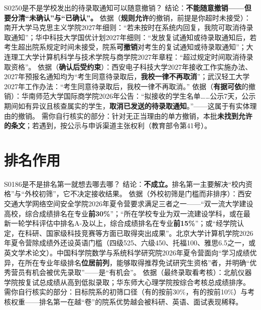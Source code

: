 \begin{qa}{S0250}{是不是学校发出的待录取通知可以随意撤销？}
结论：\textbf{不能随意撤销——但要分清“未确认”与“已确认”。}
依据（\textbf{规则允许}的撤销，前提是你超时未接受）：南开大学马克思主义学院2027年细则：“若未按时在系统内回复，我院可取消待录取通知”；华中科技大学国优计划2027年细则：“发放复试通知或待录取通知后，若考生超出院系规定时间未接受，院系\textbf{可撤销}对考生的复试通知或待录取通知”；大连理工大学计算机科学与技术学院与商学院2027年章程：“超过规定时间取消待录取资格”。
依据（\textbf{确认后受约束}）：西安电子科技大学2027年接收工作实施办法、2027年预报名通知均为“考生同意待录取后，\textbf{我校一律不再取消}”；武汉轻工大学2027年工作办法：“考生同意待录取后，我校一律不再取消。”
依据（\textbf{有据可依}的撤销）：华南师范大学国际商学院2026年公告：“拟接收的学生名单……公示7天，公示期间如有异议且核查属实的学生，\textbf{取消已发送的待录取通知}。”——这属于有实体理由的撤销。
需你自行核实的部分：针对无正当理由的单方撤销，本批\textbf{未找到允许的条文}；若遇到，按公示与申诉渠道主张权利（教育部令第41号）。
\end{qa}

\section{排名作用}
\begin{qa}{S0186}{是不是排名第一就想去哪去哪？}
结论：\textbf{不成立。}排名第一主要解决“校内资格”与“外校初筛”，它不决定接收结果。
依据（外校初筛是门槛而非排序）：西安交通大学网络空间安全学院2026年夏令营要求满足三者之一——“双一流大学建设高校，综合成绩排名在专业\textbf{前30\%}”；“所在学校专业为双一流建设学科，或在最新一轮学科评估中排名A-及以上，综合成绩排名在专业\textbf{前15\%}”；或“经学院认定，在科研、国家级科技竞赛等方面已取得突出成果”。北京大学计算机学院2026年夏令营除成绩外还设英语门槛（四级525、六级450、托福100、雅思6.5之一，或英文学术论文）。中国科学院数学与系统科学研究院2026年夏令营面向“学习成绩优异，在所在专业年级排名\textbf{位居前列}，能够取得推荐免试研究生资格”者，并明确“优秀营员有机会被优先录取”——是“有机会”。
依据（最终录取看考核）：北航仪器学院按复试总成绩从高到低拟录取；华东师大心理学院按综合考核总成绩排序。
需你自行核实的部分：目标院系的初筛口径（有的按前30\%，有的按前10\%）与考核权重——排名第一在越“卷”的院系优势越会被科研、英语、面试表现稀释。
\end{qa}

